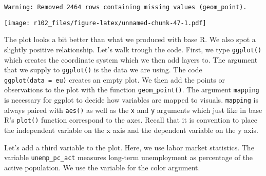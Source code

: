 \documentclass[]{article}
\newenvironment{Shaded}{\begin{snugshade}}{\end{snugshade}}
\newcommand{\DataTypeTok}[1]{\textcolor[rgb]{0.13,0.29,0.53}{#1}}
\newcommand{\DecValTok}[1]{\textcolor[rgb]{0.00,0.00,0.81}{#1}}
\newcommand{\KeywordTok}[1]{\textcolor[rgb]{0.13,0.29,0.53}{\textbf{#1}}}
\newcommand{\NormalTok}[1]{#1}
\newcommand{\OperatorTok}[1]{\textcolor[rgb]{0.81,0.36,0.00}{\textbf{#1}}}
\newcommand{\StringTok}[1]{\textcolor[rgb]{0.31,0.60,0.02}{#1}}
\begin{document}
\begin{Shaded}
\end{Shaded}

\begin{verbatim}
Warning: Removed 2464 rows containing missing values (geom_point).
\end{verbatim}

\texttt{[image: r102\_files/figure-latex/unnamed-chunk-47-1.pdf]}

The plot looks a bit better than what we produced with base R. We also spot a slightly positive relationship. Let's walk trough the code. First, we type \texttt{ggplot()} which creates the coordinate system which we then add layers to. The argument that we supply to \texttt{ggplot()} is the data we are using. The code \texttt{ggplot(data\ =\ eu)} creates an empty plot. We then add the points or observations to the plot with the function \texttt{geom\_point()}. The argument \texttt{mapping} is necessary for ggplot to decide how variables are mapped to visuals. \texttt{mapping} is always paired with \texttt{aes()} as well as the \texttt{x} and \texttt{y} arguments which just like in base R's \texttt{plot()} function correspond to the axes. Recall that it is convention to place the independent variable on the x axis and the dependent variable on the y axis.

Let's add a third variable to the plot. Here, we use labor market statistics. The variable \texttt{unemp\_pc\_act} measures long-term unemployment as percentage of the active population. We use the variable for the color argument.

\begin{Shaded}
\end{Shaded}
\end{document}
